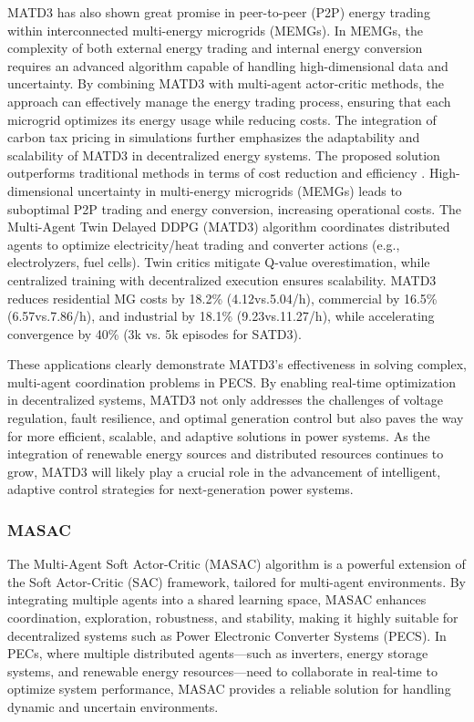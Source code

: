 MATD3 has also shown great promise in peer-to-peer (P2P) energy trading within interconnected multi-energy microgrids (MEMGs). In MEMGs, the complexity of both external energy trading and internal energy conversion requires an advanced algorithm capable of handling high-dimensional data and uncertainty. By combining MATD3 with multi-agent actor-critic methods, the approach can effectively manage the energy trading process, ensuring that each microgrid optimizes its energy usage while reducing costs. The integration of carbon tax pricing in simulations further emphasizes the adaptability and scalability of MATD3 in decentralized energy systems. The proposed solution outperforms traditional methods in terms of cost reduction and efficiency \cite{chen2021peer}. High-dimensional uncertainty in multi-energy microgrids (MEMGs) leads to suboptimal P2P trading and energy conversion, increasing operational costs. The Multi-Agent Twin Delayed DDPG (MATD3) algorithm coordinates distributed agents to optimize electricity/heat trading and converter actions (e.g., electrolyzers, fuel cells). Twin critics mitigate Q-value overestimation, while centralized training with decentralized execution ensures scalability. MATD3 reduces residential MG costs by 18.2\% (4.12vs.5.04/h), commercial by 16.5\% (6.57vs.7.86/h), and industrial by 18.1\% (9.23vs.11.27/h), while accelerating convergence by 40\% (3k vs. 5k episodes for SATD3).

These applications clearly demonstrate MATD3’s effectiveness in solving complex, multi-agent coordination problems in PECS. By enabling real-time optimization in decentralized systems, MATD3 not only addresses the challenges of voltage regulation, fault resilience, and optimal generation control but also paves the way for more efficient, scalable, and adaptive solutions in power systems. As the integration of renewable energy sources and distributed resources continues to grow, MATD3 will likely play a crucial role in the advancement of intelligent, adaptive control strategies for next-generation power systems.

\subsubsection{MASAC}

The Multi-Agent Soft Actor-Critic (MASAC) algorithm is a powerful extension of the Soft Actor-Critic (SAC) framework, tailored for multi-agent environments. By integrating multiple agents into a shared learning space, MASAC enhances coordination, exploration, robustness, and stability, making it highly suitable for decentralized systems such as Power Electronic Converter Systems (PECS). In PECs, where multiple distributed agents—such as inverters, energy storage systems, and renewable energy resources—need to collaborate in real-time to optimize system performance, MASAC provides a reliable solution for handling dynamic and uncertain environments.

